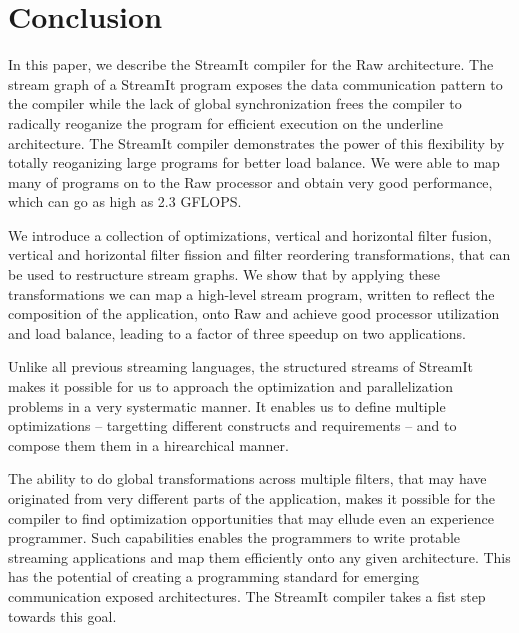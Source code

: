 \section{Conclusion}
\label{sec:conclusion}

In this paper, we describe the StreamIt compiler for the Raw
architecture.  The stream graph of a StreamIt program exposes the data
communication pattern to the compiler while the lack of global
synchronization frees the compiler to radically reoganize the program
for efficient execution on the underline architecture. The StreamIt
compiler demonstrates the power of this flexibility by totally
reoganizing large programs for better load balance. We were able to
map many of programs on to the Raw processor and obtain very good
performance, which can go as high as 2.3 GFLOPS.

We introduce a collection of optimizations, vertical and horizontal
filter fusion, vertical and horizontal filter fission and filter
reordering transformations, that can be used to restructure stream
graphs.  We show that by applying these transformations we can map a
high-level stream program, written to reflect the composition of the
application, onto Raw and achieve good processor utilization and load
balance, leading to a factor of three speedup on two applications.

Unlike all previous streaming languages, the structured streams of
StreamIt makes it possible for us to approach the optimization and
parallelization problems in a very systermatic manner. It enables us
to define multiple optimizations -- targetting different constructs
and requirements -- and to compose them them in a hirearchical manner.

The ability to do global transformations across multiple filters, that
may have originated from very different parts of the application,
makes it possible for the compiler to find optimization opportunities
that may ellude even an experience programmer.  Such capabilities
enables the programmers to write protable streaming applications and
map them efficiently onto any given architecture. This has the
potential of creating a programming standard for emerging
communication exposed architectures.  The StreamIt compiler takes a
fist step towards this goal.

